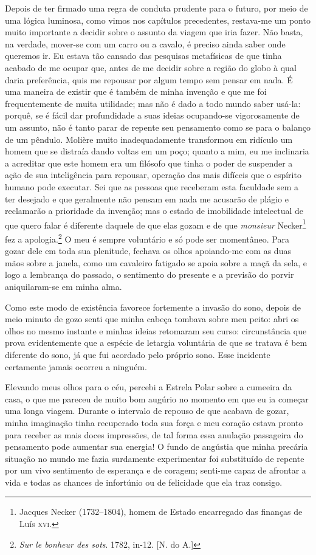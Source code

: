  Depois de ter firmado uma regra de conduta prudente para o futuro, por
meio de uma lógica luminosa, como vimos nos capítulos precedentes,
restava-me um ponto muito importante a decidir sobre o assunto da
viagem que iria fazer. Não basta, na verdade, mover-se com um carro ou
a cavalo, é preciso ainda saber onde queremos ir. Eu estava tão cansado
das pesquisas metafísicas de que tinha acabado de me ocupar que, antes
de me decidir sobre a região do globo à qual daria preferência, quis me
repousar por algum tempo sem pensar em nada. É uma maneira de existir
que é também de minha invenção e que me foi frequentemente de muita
utilidade; mas não é dado a todo mundo saber usá-la: porquê, se é fácil
dar profundidade a suas ideias ocupando-se vigorosamente de um assunto,
não é tanto parar de repente seu pensamento como se para o balanço de
um pêndulo. Molière muito inadequadamente transformou em ridículo um
homem que se distraía dando voltas em um poço; quanto a mim, eu me
inclinaria a acreditar que este homem era um filósofo que tinha o poder
de suspender a ação de sua inteligência para repousar, operação das
mais difíceis que o espírito humano pode executar. Sei que as pessoas
que receberam esta faculdade sem a ter desejado e que geralmente não
pensam em nada me acusarão de plágio e reclamarão a prioridade da
invenção; mas o estado de imobilidade intelectual de que quero falar é
diferente daquele de que elas gozam e de que \textit{monsieur}
Necker\footnote{ Jacques Necker (1732--1804), homem de Estado
encarregado das finanças de Luís \textsc{xvi}.} fez a apologia.\footnote{
\textit{Sur le bonheur des sots}. 1782, in-12. [N. do A.]}  O meu é sempre
voluntário e só pode ser momentâneo. Para gozar dele em toda sua
plenitude, fechava os olhos apoiando-me com as duas mãos sobre a
janela, como um cavaleiro fatigado se apoia sobre a maçã da sela, e
logo a lembrança do passado, o sentimento do presente e a previsão do
porvir aniquilaram-se em minha alma.

 Como este modo de existência favorece fortemente a invasão do sono,
depois de meio minuto de gozo senti que minha cabeça tombava sobre meu
peito: abri os olhos no mesmo instante e minhas ideias retomaram seu
curso: circunstância que prova evidentemente que a espécie de letargia
voluntária de que se tratava é bem diferente do sono, já que fui
acordado pelo próprio sono. Esse incidente certamente jamais ocorreu a ninguém.

 Elevando meus olhos para o céu, percebi a Estrela Polar sobre a
cumeeira da casa, o que me pareceu de muito bom augúrio no momento em
que eu ia começar uma longa viagem. Durante o intervalo de repouso de
que acabava de gozar, minha imaginação tinha recuperado toda sua força
e meu coração estava pronto para receber as mais doces impressões, de
tal forma essa anulação passageira do pensamento pode aumentar sua
energia! O fundo de angústia que minha precária situação no mundo me
fazia surdamente experimentar foi substituído de repente por um vivo
sentimento de esperança e de coragem; senti-me capaz de afrontar a vida
e todas as chances de infortúnio ou de felicidade que ela traz consigo.

